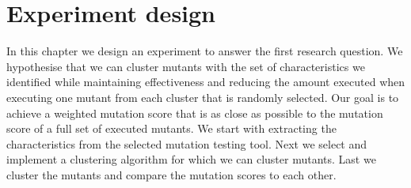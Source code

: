 \documentclass[../../main]{subfiles}
\begin{document}
\clearpage
\section{Experiment design}
In this chapter we design an experiment to answer the first research question.
We hypothesise that we can cluster mutants with the set of characteristics we identified
while maintaining effectiveness and reducing the amount executed when executing one mutant from each cluster that is randomly selected.
Our goal is to achieve a weighted mutation score that is as close as possible to the mutation score of a full set of executed mutants.
\newline
We start with extracting the characteristics from the selected mutation testing tool. 
Next we select and implement a clustering algorithm for which we can cluster mutants.
Last we cluster the mutants and compare the mutation scores to each other. 
\end{document}

